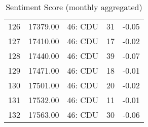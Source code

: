 \begin{table}[ht]
\begin{tabular}{rrlrr}
  126 & 17379.00 & 46: CDU &  31 & -0.05 \\ 
  127 & 17410.00 & 46: CDU &  17 & -0.02 \\ 
  128 & 17440.00 & 46: CDU &  39 & -0.07 \\ 
  129 & 17471.00 & 46: CDU &  18 & -0.01 \\ 
  130 & 17501.00 & 46: CDU &  20 & -0.02 \\ 
  131 & 17532.00 & 46: CDU &  11 & -0.01 \\ 
  132 & 17563.00 & 46: CDU &  30 & -0.06 \\ 
   \hline
\end{tabular}
\caption{Sentiment Score (monthly aggregated)} 
\label{t_sentscore_month}
\end{table}
